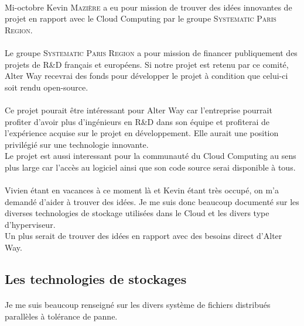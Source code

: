 \paragraph*{}
Mi-octobre Kevin \textsc{Mazière} a eu pour mission de trouver des idées innovantes de projet en rapport avec le Cloud Computing par le groupe \textsc{Systematic Paris Region}.

\paragraph*{}
Le groupe \textsc{Systematic Paris Region} a pour mission de financer publiquement des projets de R\&D français et européens. Si notre projet est retenu par ce comité, Alter Way
recevrai des fonds pour développer le projet à condition que celui-ci soit rendu open-source.

\paragraph*{}
Ce projet pourait être intéressant pour Alter Way car l'entreprise pourrait profiter d'avoir plus d'ingénieurs en R\&D dans son équipe et profiterai de l'expérience acquise sur le
projet en développement. Elle aurait une position privilégié sur une technologie innovante.\\
Le projet est aussi interessant pour la communauté du Cloud Computing au sens plus large car l'accès au logiciel ainsi que son code source serai disponible à tous.


\paragraph*{}
Vivien étant en vacances à ce moment là et Kevin étant très occupé, on m'a demandé d'aider à trouver des idées.
Je me suis donc beaucoup documenté sur les diverses technologies de stockage utilisées dans le Cloud et les divers type d'hyperviseur.
\\
Un plus serait de trouver des idées en rapport avec des besoins direct d'Alter Way.


\subsection{Les technologies de stockages}
\paragraph*{}
Je me suis beaucoup renseigné sur les divers système de fichiers distribués parallèles à tolérance de panne.

